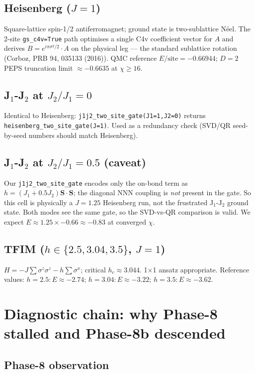 \documentclass[aps,prresearch,reprint,amsmath,amssymb,floatfix]{revtex4-2}
\newcommand{\code}[1]{\texttt{#1}}
\begin{document}
\subsection*{Heisenberg ($J=1$)}
Square-lattice spin-1/2 antiferromagnet; ground state is two-sublattice
N\'eel. The 2-site \code{gs\_c4v=True} path optimises a single C4v
coefficient vector for $A$ and derives $B = e^{i\pi\sigma^y/2}\!\cdot\!A$
on the physical leg --- the standard sublattice rotation
(Corboz, PRB 94, 035133 (2016)). QMC reference $E/\text{site}=-0.66944$;
$D=2$ PEPS truncation limit $\approx -0.6635$ at $\chi\!\geq\!16$.

\subsection*{J$_1$-J$_2$ at $J_2/J_1=0$}
Identical to Heisenberg: \code{j1j2\_two\_site\_gate(J1=1,J2=0)} returns
\code{heisenberg\_two\_site\_gate(J=1)}.  Used as a redundancy check
(SVD/QR seed-by-seed numbers should match Heisenberg).

\subsection*{J$_1$-J$_2$ at $J_2/J_1=0.5$ (caveat)}
Our \code{j1j2\_two\_site\_gate} encodes only the on-bond term as
$h = (J_1 + 0.5J_2)\mathbf{S}\!\cdot\!\mathbf{S}$; the diagonal NNN coupling
is \emph{not} present in the gate. So this cell is physically a $J=1.25$
Heisenberg run, not the frustrated J$_1$-J$_2$ ground state.  Both modes
see the same gate, so the SVD-vs-QR comparison is valid.  We expect
$E\approx 1.25\times -0.66 \approx -0.83$ at converged $\chi$.

\subsection*{TFIM ($h\in\{2.5,3.04,3.5\}$, $J=1$)}
$H = -J\sum\sigma^z\sigma^z - h\sum\sigma^x$; critical $h_c\approx 3.044$.
1$\times$1 ansatz appropriate. Reference values:
$h=2.5: E\approx -2.74$;
$h=3.04: E\approx -3.22$;
$h=3.5: E\approx -3.62$.

\section{Diagnostic chain: why Phase-8 stalled and Phase-8b descended}

\subsection{Phase-8 observation}
\end{document}
